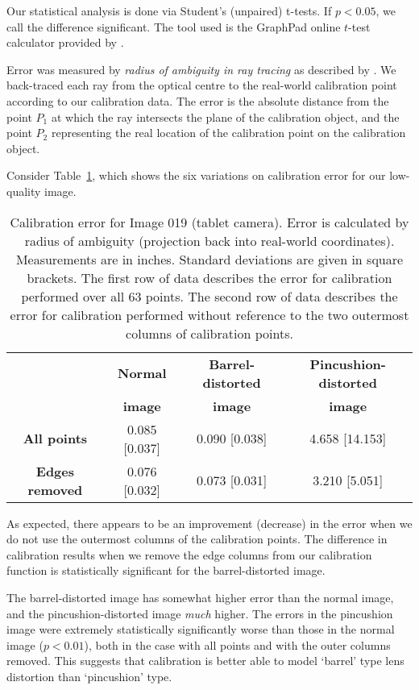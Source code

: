 Our statistical analysis is done via Student's (unpaired) t-tests. If $p < 0.05$, we call the difference significant. The tool used is the GraphPad online $t$-test calculator provided by \citet{testcalc}.

Error was measured by \emph{radius of ambiguity in ray tracing} as described by \citet{TSAI}. We back-traced each ray from the optical centre to the real-world calibration point according to our calibration data. The error is the absolute distance from the point $P_{1}$ at which the ray intersects the plane of the calibration object, and the point $P_{2}$ representing the real location of the calibration point on the calibration object.

Consider Table~\ref{tbl:stats090}, which shows the six variations on calibration error for our low-quality image.

\begin{table}[h!]
  \centering
  \begin{tabular}{c c c c}
    \toprule
    \textbf{ } & \textbf{Normal} & \textbf{Barrel-distorted} & \textbf{Pincushion-distorted}\\
    \textbf{ } & \textbf{image} & \textbf{image} & \textbf{image}\\
    \midrule
    \textbf{All points} & 0.085 [0.037] & 0.090 [0.038] & 4.658 [14.153] \\
    \textbf{Edges removed} & 0.076 [0.032] & 0.073 [0.031] & 3.210 [5.051] \\
    \bottomrule
  \end{tabular}
  \caption[Calibration error for Image 019 (tablet camera)]{Calibration error for Image 019 (tablet camera). Error is calculated by radius of ambiguity (projection back into real-world coordinates). Measurements are in inches. Standard deviations are given in square brackets. The first row of data describes the error for calibration performed over all 63 points. The second row of data describes the error for calibration performed without reference to the two outermost columns of calibration points.}
  \label{tbl:stats090}
\end{table}

As expected, there appears to be an improvement (decrease) in the error when we do not use the outermost columns of the calibration points. The difference in calibration results when we remove the edge columns from our calibration function is statistically significant for the barrel-distorted image.

The barrel-distorted image has somewhat higher error than the normal image, and the pincushion-distorted image \emph{much} higher. The errors in the pincushion image were extremely statistically significantly worse than those in the normal image ($p < 0.01$), both in the case with all points and with the outer columns removed. This suggests that calibration is better able to model `barrel' type lens distortion than `pincushion' type.

